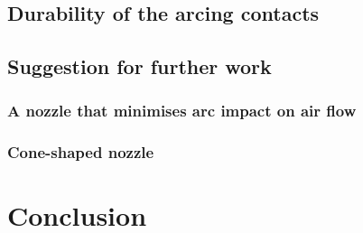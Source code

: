 \documentclass[10pt,b5paper,twoside]{article}
\begin{document}
\subsection{Durability of the arcing contacts} \label{fig:durability}


\newpage
\subsection{Suggestion for further work}
\subsubsection{A nozzle that minimises arc impact on air flow}


\subsubsection{Cone-shaped nozzle}


\cleardoublepage

\section{Conclusion}
\end{document}
